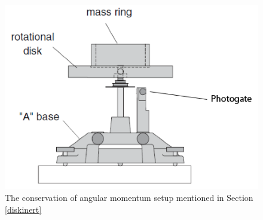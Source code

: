 \begin{figure}[h]
	\begin{center}
		\includegraphics[width=0.6\linewidth]{./Exp1-8/pic/othersetup.png}
	\end{center}
	\caption{The conservation of angular momentum setup mentioned in Section \ref{diskinert}}
	\label{fig:rotinert}
\end{figure}

